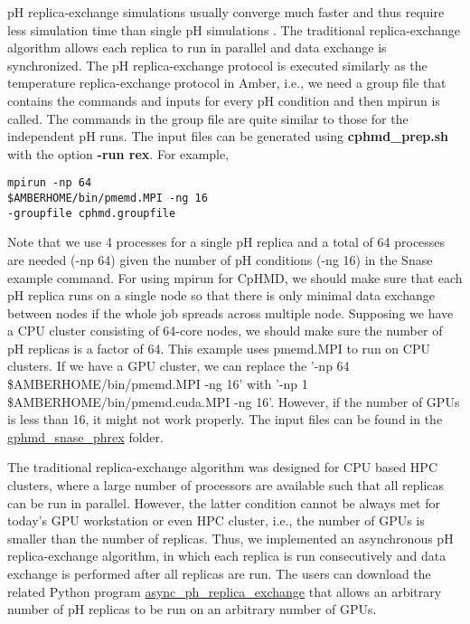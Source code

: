 pH replica-exchange simulations usually converge
much faster and thus require less simulation time than single pH simulations \cite{Wallace_Shen_2011_J.Chem.TheoryComput.,Harris_Shen_2019_J.Chem.Inf.Model.,Harris_Shen_2020_J.Chem.TheoryComput.}. 
The traditional replica-exchange algorithm
allows each replica to run in parallel and 
data exchange is synchronized.
The pH replica-exchange protocol is executed
similarly as the temperature replica-exchange protocol in Amber, 
i.e., we need a group file that contains the commands and inputs for every pH condition and then mpirun is called. 
The commands in the group file are quite similar to those for 
the independent pH runs. 
The input files can be generated using 
\textbf{cphmd\_prep.sh} with the option \textbf{-run rex}.
For example,
\begin{lstlisting}
mpirun -np 64 
$AMBERHOME/bin/pmemd.MPI -ng 16 
-groupfile cphmd.groupfile
\end{lstlisting}
Note that we use 4 processes for a single pH replica and a total of 64 processes are needed (-np 64) given the number of pH conditions (-ng 16) in the Snase example command. 
For using mpirun for CpHMD, we should make sure that each pH replica runs on a single node so that there is only minimal data exchange between nodes if the whole job spreads across multiple node. Supposing we have a CPU cluster consisting of 64-core nodes, we should make sure the number of pH replicas is a factor of 64. 
This example uses pmemd.MPI to run on CPU clusters. 
If we have a GPU cluster, we can replace the '-np 64 
\$AMBERHOME/bin/pmemd.MPI -ng 16' with '-np 1 
\$AMBERHOME/bin/pmemd.cuda.MPI -ng 16'. However, if the number of GPUs is less than 16, it might not work properly.  
The input files can be found in the \href{https://gitlab.com/shenlab-amber-cphmd/cphmd-tutorial/-/tree/main/gphmd_Amber/gphmd_snase_phrex}{gphmd\_snase\_phrex} folder.

The traditional replica-exchange algorithm was designed for CPU based HPC clusters, where a large number of processors are available such that all replicas can be run in parallel. 
However, the latter condition cannot be always met for today's GPU workstation or even HPC cluster, i.e., the number of GPUs is smaller than the number of replicas. Thus, we implemented an asynchronous pH replica-exchange algorithm, \cite{Henderson_Shen_2020_J.Chem.Phys.}
in which each replica is run consecutively and data exchange is performed after all replicas are run.
The users can download the related Python program \href{https://gitlab.com/shenlab-amber-cphmd/async_ph_replica_exchange}{async\_ph\_replica\_exchange} that allows an arbitrary number of pH replicas to be run on an arbitrary number of GPUs.

